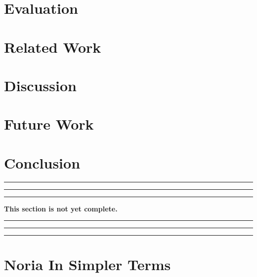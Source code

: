 \documentclass[fontsize=12pt,paper=letter,draft=true]{scrbook}
\newcommand{\resume}{
  \begin{center}
    \color{set2}
    \hrule
    \vspace{1pt}
    \hrule
    \hrule
    \vspace{10pt}
    \textbf{This section is not yet complete.}
    \vspace{10pt}
    \hrule
    \hrule
    \vspace{1pt}
    \hrule
  \end{center}
}
\begin{document}


\chapter{Evaluation}
\label{s:eval}



\chapter{Related Work}
\label{s:related}



\chapter{Discussion}
\label{s:disc}



\chapter{Future Work}
\label{s:future}



\chapter{Conclusion}

\resume

\appendix
\chapter{Noria In Simpler Terms}
\label{s:simple}



\backmatter

\begin{spacing}{1}
\printbibliography
\end{spacing}
\end{document}

